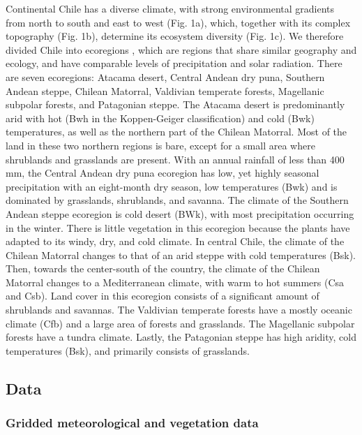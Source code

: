 \documentclass[
  sn-nature,
  numbered]{sn-jnl}
\begin{document}
Continental Chile has a diverse climate, with strong environmental
gradients from north to south and east to west \citep{Aceituno2021}
(Fig. 1a), which, together with its complex topography (Fig. 1b),
determine its ecosystem diversity \citep{Garreaud2009, Luebert2022}
(Fig. 1c). We therefore divided Chile into ecoregions
\citep{Dinerstein2017}, which are regions that share similar geography
and ecology, and have comparable levels of precipitation and solar
radiation. There are seven ecoregions: Atacama desert, Central Andean
dry puna, Southern Andean steppe, Chilean Matorral, Valdivian temperate
forests, Magellanic subpolar forests, and Patagonian steppe. The Atacama
desert is predominantly arid with hot (Bwh in the Koppen-Geiger
classification) and cold (Bwk) temperatures, as well as the northern
part of the Chilean Matorral. Most of the land in these two northern
regions is bare, except for a small area where shrublands and grasslands
are present. With an annual rainfall of less than 400 mm, the Central
Andean dry puna ecoregion has low, yet highly seasonal precipitation
with an eight-month dry season, low temperatures (Bwk) and is dominated
by grasslands, shrublands, and savanna. The climate of the Southern
Andean steppe ecoregion is cold desert (BWk), with most precipitation
occurring in the winter. There is little vegetation in this ecoregion
because the plants have adapted to its windy, dry, and cold climate. In
central Chile, the climate of the Chilean Matorral changes to that of an
arid steppe with cold temperatures (Bsk). Then, towards the center-south
of the country, the climate of the Chilean Matorral changes to a
Mediterranean climate, with warm to hot summers (Csa and Csb). Land
cover in this ecoregion consists of a significant amount of shrublands
and savannas. The Valdivian temperate forests have a mostly oceanic
climate (Cfb) and a large area of forests and grasslands. The Magellanic
subpolar forests have a tundra climate. Lastly, the Patagonian steppe
has high aridity, cold temperatures (Bsk), and primarily consists of
grasslands.

\subsection{Data}\label{data}

\subsubsection{Gridded meteorological and vegetation
data}\label{gridded-meteorological-and-vegetation-data}
\end{document}
